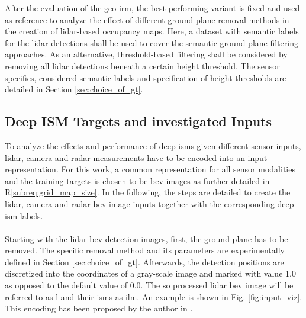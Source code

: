 After the evaluation of the geo \gls{irm}, the best performing variant is fixed and used as reference to analyze the effect of different ground-plane removal methods in the creation of lidar-based occupancy maps. Here, a dataset with semantic labels for the lidar detections shall be used to cover the semantic ground-plane filtering approaches. As an alternative, threshold-based filtering shall be considered by removing all lidar detections beneath a certain height threshold. The sensor specifics, considered semantic labels and specification of height thresholds are detailed in Section \ref{sec:choice_of_gt}. 
%
\subsection{Deep ISM Targets and investigated Inputs}
\label{subsec:def_of_targets_n_inputs}
To analyze the effects and performance of deep \gls{ism}s given different sensor inputs, lidar, camera and radar measurements have to be encoded into an input representation. For this work, a common representation for all sensor modalities and the training targets is chosen to be \gls{bev} images as further detailed in R\ref{subreq:grid_map_size}. In the following, the steps are detailed to create the lidar, camera and radar \gls{bev} image inputs together with the corresponding deep \gls{ism} labels. 
\\\\
Starting with the lidar \gls{bev} detection images, first, the ground-plane has to be removed. The specific removal method and its parameters are experimentally defined in Section \ref{sec:choice_of_gt}. Afterwards, the detection positions are discretized into the coordinates of a gray-scale image and marked with value 1.0 as opposed to the default value of 0.0. The so processed lidar \gls{bev} image will be referred to as \gls{l} and their \gls{ism}s as \gls{ilm}. An example is shown in Fig. \ref{fig:input_viz}. This encoding has been proposed by the author in \cite{bauer2019deepame}.
\\\\
